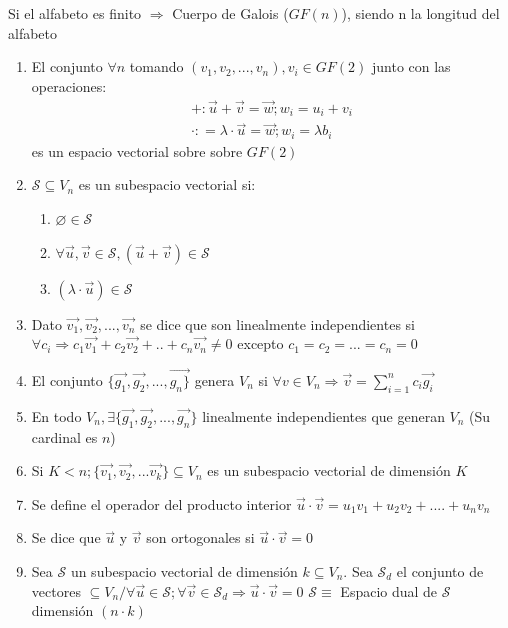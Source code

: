 \documentclass{article}
\begin{document}
Si el alfabeto es finito $\Rightarrow$ Cuerpo de Galois ($GF(n)$), siendo n la longitud del alfabeto

\begin{enumerate}
    \item El conjunto $\forall n$ tomando $(v_1, v_2, ..., v_n), v_i\in GF(2)$ junto con las operaciones:
    \begin{equation}
        \begin{split}
            +: \vec{u} + \vec{v} = \vec{w}; w_i = u_i +v_i \\
            \cdot: = \lambda \cdot \vec{u}=\vec{w}; w_i=\lambda b_i
        \end{split}
    \end{equation}
    es un espacio vectorial sobre sobre $GF(2)$     
    \item $\mathcal{S} \subseteq V_n$ es un subespacio vectorial si:
    \begin{enumerate}
        \item $\varnothing \in \mathcal{S}$
        \item $\forall \vec{u}, \vec{v}\in \mathcal{S}, (\vec{u} + \vec{v}) \in \mathcal{S}$
        \item $(\lambda\cdot\vec{u})\in \mathcal{S}$
    \end{enumerate}
    \item Dato $\vec{v_1}, \vec{v_2}, ..., \vec{v_n}$ se dice que son linealmente independientes si $\forall c_i \Rightarrow c_1\vec{v_1} + c_2\vec{v_2} + .. + c_n\vec{v_n} \neq 0$ excepto $c_1 = c_2 = ... = c_n = 0$
    \item El conjunto $\{\vec{g_1}, \vec{g_2}, ..., \vec{g_n\}}$ genera $V_n$ si $\forall v \in V_n \Rightarrow \vec{v} = \sum_{i=1}^{n}{c_i\vec{g_i}}$
    \item En todo $V_n, \exists\{\vec{g_1}, \vec{g_2}, ..., \vec{g_n}\}$ linealmente independientes que generan $V_n$ (Su cardinal es $n$)
    \item Si $K < n; \{\vec{v_1}, \vec{v_2}, ... \vec{v_k}\}\subseteq V_n$ es un subespacio vectorial de dimensión $K$
    \item Se define el operador del producto interior $\vec{u} \cdot \vec{v} = u_1v_1+u_2v_2+....+u_nv_n$
    \item Se dice que $\vec{u}$ y $\vec{v}$ son ortogonales si $\vec{u}\cdot\vec{v} = 0$
    \item Sea $\mathcal{S}$ un subespacio vectorial de dimensión $k\subseteq V_n$. Sea $\mathcal{S}_d$ el conjunto de vectores $\subseteq V_n / \forall \vec{u} \in \mathcal{S}; \forall \vec{v} \in \mathcal{S}_d \Rightarrow \vec{u} \cdot \vec{v}=0$ $\mathcal{S} \equiv$ Espacio dual de $\mathcal{S}$ dimensión $(n \cdot k)$

\end{enumerate}
\end{document}
